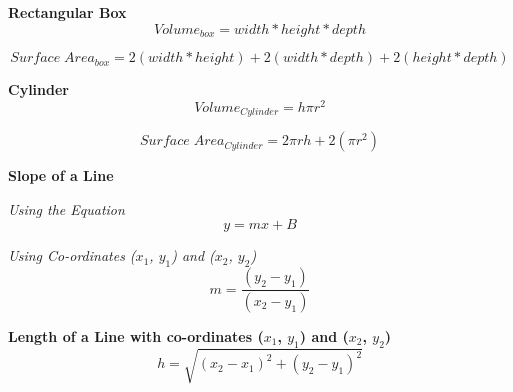 \documentclass{article}
\begin{document}
\textbf{Rectangular Box}
\begin{equation}
Volume_{box} = width * height * depth
\end{equation}

\begin{equation}
Surface\;Area_{box} = 2(width * height) + 2(width * depth) + 2(height * depth)
\end{equation}

\textbf{Cylinder}
\begin{equation}
Volume_{ Cylinder} = h \pi r^ 2
\end{equation}

\begin{equation}
Surface\;Area_{ Cylinder} = 2 \pi r h + 2(\pi r^ 2 )
\end{equation}

\textbf{Slope of a Line}

\textit{Using the Equation}
\begin{equation}
y = mx + B
\end{equation}

\textit{Using Co-ordinates ($x_1$, $y_1$) and ($x_2$, $y_2$) }
\begin{equation}
m = \frac{ (y_2 - y_1) }{ (x_2 - y_1) }
\end{equation}

\textbf{Length of a Line with co-ordinates  ($x_1$, $y_1$) and ($x_2$, $y_2$) }
\begin{equation}
h= \sqrt{(x_{2}-x_{1})^2 + (y_{2}-y_{1})^2}
\end{equation}
\end{document}
